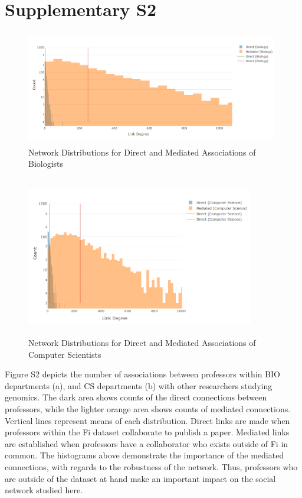 \documentclass[10pt]{article}         %
\begin{document}
\newpage
\section{Supplementary S2}
\begin{figure}[!htb]
  \centering
  \includegraphics[width=11cm, height=5cm]{Fig2SA.PNG}
  \caption{Network Distributions for Direct and Mediated Associations of Biologists}
  \label{fig:S2A}
\end{figure}
\begin{figure}[!htb]
  \centering
  \includegraphics[width=10cm, height=7cm]{Fig2SB.PNG}
  \caption{Network Distributions for Direct and Mediated Associations of Computer Scientists}
  \label{fig:S2B}
\end{figure}
Figure S2 depicts the number of associations between professors within BIO departments (a), and CS departments (b) with other researchers studying genomics. The dark area shows counts of the direct connections between professors, while the lighter orange area shows counts of mediated connections. Vertical lines represent means of each distribution. Direct links are made when professors within the Fi dataset collaborate to publish a paper. Mediated links are established when professors have a collaborator who exists outside of Fi in common. The histograms above demonstrate the importance of the mediated connections, with regards to the robustness of the network. Thus, professors who are outside of the dataset at hand make an important impact on the social network studied here.  
\end{document}
